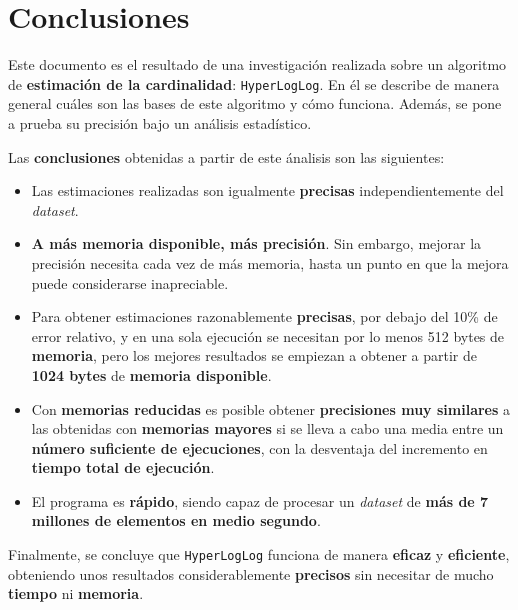 % 
\section{Conclusiones}
\label{conclusiones}

Este documento es el resultado de una investigación realizada sobre un algoritmo de \textbf{estimación de la cardinalidad}:
\texttt{HyperLogLog}. En él se describe de manera general cuáles son las bases de este algoritmo y cómo funciona. Además, se
pone a prueba su precisión bajo un análisis estadístico.

Las \textbf{conclusiones} obtenidas a partir de este ánalisis son las  siguientes:

\begin{itemize}
	\item Las estimaciones realizadas son igualmente \textbf{precisas} independientemente del \emph{dataset}.
	\item \textbf{A más memoria disponible, más precisión}. Sin embargo, mejorar la precisión necesita cada vez de más memoria, hasta un punto en que la mejora puede considerarse inapreciable.
	\item Para obtener estimaciones razonablemente \textbf{precisas}, por debajo del 10\% de error relativo, y en una sola ejecución se
necesitan por lo menos 512 bytes de \textbf{memoria}, pero los mejores resultados se empiezan a obtener a partir de
\textbf{1024 bytes} de \textbf{memoria disponible}.
	\item Con \textbf{memorias reducidas} es posible obtener \textbf{precisiones muy similares} a las obtenidas con
\textbf{memorias mayores} si se lleva a cabo una media entre un \textbf{número suficiente de ejecuciones}, con la desventaja del
incremento en \textbf{tiempo total de ejecución}.
	\item El programa es \textbf{rápido}, siendo capaz de procesar un \emph{dataset} de \textbf{más de 7 millones de elementos en medio segundo}.
\end{itemize}

Finalmente, se concluye que \texttt{HyperLogLog} funciona de manera \textbf{eficaz} y \textbf{eficiente}, obteniendo unos resultados
considerablemente \textbf{precisos} sin necesitar de mucho \textbf{tiempo} ni \textbf{memoria}.
